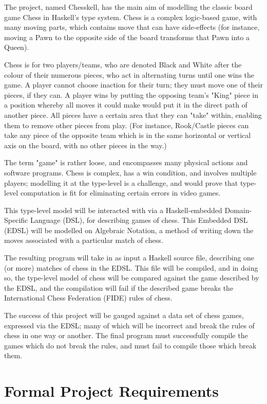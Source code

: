 \documentclass[12pt, a4paper]{scrartcl}
\begin{document}
The project, named Chesskell, has the main aim of modelling the classic board game Chess in Haskell's type system. Chess is a complex logic-based game, with many moving parts, which contains move that can have side-effects (for instance, moving a Pawn to the opposite side of the board transforms that Pawn into a Queen).

Chess is for two players/teams, who are denoted Black and White after the colour of their numerous pieces, who act in alternating turns until one wins the game. A player cannot choose inaction for their turn; they must move one of their pieces, if they can. A player wins by putting the opposing team's "King" piece in a position whereby all moves it could make would put it in the direct path of another piece. All pieces have a certain area that they can "take" within, enabling them to remove other pieces from play. (For instance, Rook/Castle pieces can take any piece of the opposite team which is in the same horizontal or vertical axis on the board, with no other pieces in the way.)

The term "game" is rather loose, and encompasses many physical actions and software programs. Chess is complex, has a win condition, and involves multiple players; modelling it at the type-level is a challenge, and would prove that type-level computation is fit for eliminating certain errors in video games.

This type-level model will be interacted with via a Haskell-embedded Domain-Specific Language (DSL), for describing games of chess. This Embedded DSL (EDSL) will be modelled on Algebraic Notation, a method of writing down the moves associated with a particular match of chess.

The resulting program will take in as input a Haskell source file, describing one (or more) matches of chess in the EDSL. This file will be compiled, and in doing so, the type-level model of chess will be compared against the game described by the EDSL, and the compilation will fail if the described game breaks the International Chess Federation (FIDE) rules of chess.

The success of this project will be gauged against a data set of chess games, expressed via the EDSL; many of which will be incorrect and break the rules of chess in one way or another. The final program must successfully compile the games which do not break the rules, and must fail to compile those which break them.

\section{Formal Project Requirements}
\end{document}
